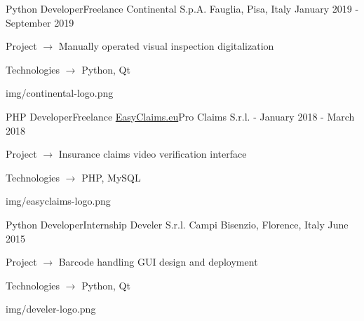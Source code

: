\begin{cventries}
  \logocventry
    {Python Developer{\enskip\cdotp\enskip}Freelance}
    {Continental S.p.A.}
    {Fauglia, Pisa, Italy}
    {January 2019 - September 2019}
    {
      \begin{cvitems}
        \item {Project $\rightarrow$ Manually operated visual inspection digitalization}
        \item {Technologies $\rightarrow$ Python, Qt}
      \end{cvitems}
    }
    {img/continental-logo.png}

  \logocventry
    {PHP Developer{\enskip\cdotp\enskip}Freelance}
    {\href{https://www.easyclaims.eu}{EasyClaims.eu}{\enskip\cdotp\enskip}Pro Claims S.r.l.}
    {-}
    {January 2018 - March 2018}
    {
      \begin{cvitems}
        \item {Project $\rightarrow$ Insurance claims video verification interface}
        \item {Technologies $\rightarrow$ PHP, MySQL}
      \end{cvitems}
    }
    {img/easyclaims-logo.png}

  \logocventry
    {Python Developer{\enskip\cdotp\enskip}Internship}
    {Develer S.r.l.}
    {Campi Bisenzio, Florence, Italy}
    {June 2015}
    {
      \begin{cvitems}
        \item {Project $\rightarrow$ Barcode handling GUI design and deployment}
        \item {Technologies $\rightarrow$ Python, Qt}
      \end{cvitems}
    }
    {img/develer-logo.png}

\end{cventries}
